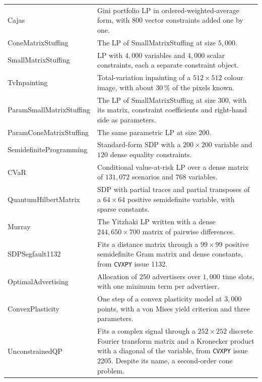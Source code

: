 {\begin{longtable}{l >{\raggedright\arraybackslash}p{9.6cm}}
Cajas & Gini portfolio \ac{LP} in ordered-weighted-average form, with $800$ vector constraints added one by one. \\
ConeMatrixStuffing & The \ac{LP} of SmallMatrixStuffing at size $5{,}000$. \\
SmallMatrixStuffing & \ac{LP} with $4{,}000$ variables and $4{,}000$ scalar constraints, each a separate constraint object. \\
TvInpainting & Total-variation inpainting of a $512 \times 512$ colour image, with about $30\,\%$ of the pixels known. \\
ParamSmallMatrixStuffing & The \ac{LP} of SmallMatrixStuffing at size $300$, with its matrix, constraint coefficients and right-hand side as parameters. \\
ParamConeMatrixStuffing & The same parametric \ac{LP} at size $200$. \\
SemidefiniteProgramming & Standard-form \ac{SDP} with a $200 \times 200$ variable and $120$ dense equality constraints. \\
CVaR & Conditional value-at-risk \ac{LP} over a dense matrix of $131{,}072$ scenarios and $768$ variables. \\
QuantumHilbertMatrix & \ac{SDP} with partial traces and partial transposes of a $64 \times 64$ positive semidefinite variable, with sparse constants. \\
Murray & The Yitzhaki \ac{LP} written with a dense $244{,}650 \times 700$ matrix of pairwise differences. \\
SDPSegfault1132 & Fits a distance matrix through a $99 \times 99$ positive semidefinite Gram matrix and dense constants, from \texttt{CVXPY} issue 1132. \\
OptimalAdvertising & Allocation of $250$ advertisers over $1{,}000$ time slots, with one minimum term per advertiser. \\
ConvexPlasticity & One step of a convex plasticity model at $3{,}000$ points, with a von Mises yield criterion and three parameters. \\
UnconstrainedQP & Fits a complex signal through a $252 \times 252$ discrete Fourier transform matrix and a Kronecker product with a diagonal of the variable, from \texttt{CVXPY} issue 2205. Despite its name, a second-order cone problem. \\
\end{longtable}}

